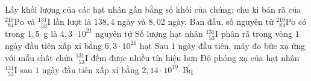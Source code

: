 \begin{ex}
\begin{center}
\begin{tikzpicture}[scale=0.82,line join=round,line cap=round,font=\footnotesize]
			\end{tikzpicture}
		\end{center}
		Lấy khối lượng của các hạt nhân gần bằng số khối của chúng; chu kì bán rã của $^{210}_{\phantom{1}84}\text{Po}$ và ${}^{131}_{\phantom{1}53}\text{I}$ lần lượt là $138{,}4$ ngày và $8{,}02$ ngày.
		\choiceTFt
		{\True Ban đầu, số nguyên tử $^{210}_{\phantom{1}84}\text{Po}$ có trong $1{,}5$~g là $4{,}3\cdot 10^{21}$ nguyên tử}
		{Số lượng hạt nhân ${}^{131}_{\phantom{1}53}\text{I}$ phân rã trong vòng $1$ ngày đầu tiên xấp xỉ bằng $6{,}3\cdot 10^{21}$ hạt}
		{\True Sau $1$ ngày đầu tiên, máy đo bức xạ ứng với mẫu chất chứa ${}^{131}_{\phantom{1}53}\text{I}$ đếm được nhiều tín hiệu hơn}
		{Độ phóng xạ của hạt nhân ${}^{131}_{\phantom{1}53}\text{I}$ sau $1$ ngày đầu tiên xấp xỉ bằng $2{,}14\cdot 10^{19}$~Bq}
	\end{ex}

